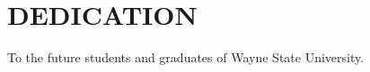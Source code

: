 \section*{DEDICATION}
\begin{center}
	To the future students and graduates of Wayne State University.
\end{center}
